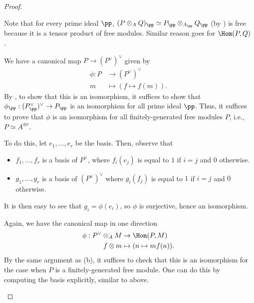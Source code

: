 \begin{proof}
\begin{alphenum}
    \item Note that for every prime ideal $\pp$,
    $(P\otimes_A Q)_\pp \simeq P_\pp\otimes_{A_\pp} Q_\pp$
    (by ) is free 
    because it is a tensor product of free modules.
    Similar reason goes for $\Hom(P,Q)$.
    \item We have a canonical map $P \to (P^\vee)^\vee$ given by
    \begin{align*}
        \phi : P &\to (P^\vee)^\vee \\
        m &\mapsto (f \mapsto f(m)).
    \end{align*}
    By ,
    to show that this is an isomorphism,
    it suffices to show that $\phi_\pp : 
    (P_\pp^\vee)^\vee \to P_\pp$ is an isomorphism
    for all prime ideal $\pp$.
    Thus, it suffices to prove that $\phi$
    is an isomorphism for all finitely-generated free modules $P$,
    i.e., $P\simeq A^{\oplus r}$.
    
    To do this, let $e_1,\dots, e_r$ be the basis.
    Then, observe that
    \begin{itemize}
    \item $f_1,\dots,f_r$ is a basis of $P^\vee$,
    where $f_i(e_j)$ is equal to $1$ if $i=j$ and $0$ otherwise.
    \item $g_1,\dots, g_r$ is a basis of $(P^\vee)^\vee$
    where $g_i(f_j)$ is equal to $1$ if $i=j$
    and $0$ otherwise.
    \end{itemize}
    It is then easy to see that $g_i = \phi(e_i)$,
    so $\phi$ is surjective, hence an isomorphism.
    
    \item Again, we have the canonical map in one direction
    \begin{align*}
        \phi : P^\vee \otimes_A M &\to \Hom(P,M) \\
        f \otimes m &\mapsto (n\mapsto mf(n)).
    \end{align*}
    By the same argument as (b),
    it suffices to check that this is an isomorphism
    for the case when $P$ is a finitely-generated free module. 
    One can do this by computing the basis explicitly,
    similar to above. \qedhere
\end{alphenum}
\end{proof}

